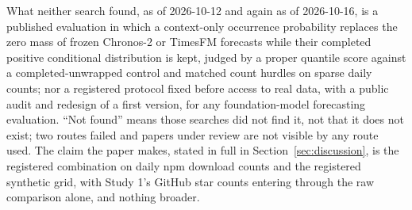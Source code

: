 What neither search found, as of 2026-10-12 and again as of 2026-10-16, is a published evaluation in which a
context-only occurrence probability replaces the zero mass of frozen Chronos-2 or TimesFM forecasts while
their completed positive conditional distribution is kept, judged by a proper quantile score against a
completed-unwrapped control and matched count hurdles on sparse daily counts; nor a registered protocol
fixed before access to real data, with a public audit and redesign of a first version, for any
foundation-model forecasting evaluation. ``Not found'' means those searches did not find it, not that it
does not exist; two routes failed and papers under review are not visible by any route used. The claim the
paper makes, stated in full in Section~\ref{sec:discussion}, is the registered combination on daily npm
download counts and the registered synthetic grid, with Study 1's GitHub star counts entering through the
raw comparison alone, and nothing broader.
